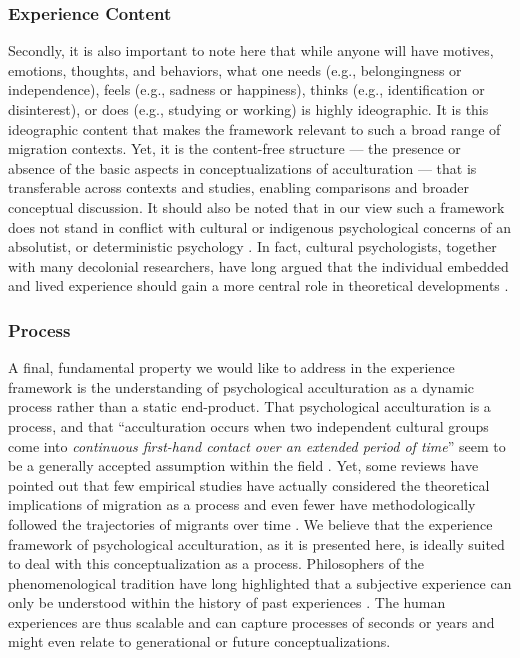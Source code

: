 \documentclass[man, 12pt, a4paper, mask]{apa7}
\begin{document}
\subsubsection{Experience Content}
Secondly, it is also important to note here that while anyone will have motives, emotions, thoughts, and behaviors, what one needs (e.g., belongingness or independence), feels (e.g., sadness or happiness), thinks (e.g., identification or disinterest), or does (e.g., studying or working) is highly ideographic. It is this ideographic content that makes the framework relevant to such a broad range of migration contexts. Yet, it is the content-free structure --- the presence or absence of the basic aspects in conceptualizations of acculturation --- that is transferable across contexts and studies, enabling comparisons and broader conceptual discussion. It should also be noted that in our view such a framework does not stand in conflict with cultural or indigenous psychological concerns of an absolutist, or deterministic psychology \citep[e.g.,][]{Kim2006a}. In fact, cultural psychologists, together with many decolonial researchers, have long argued that the individual embedded and lived experience should gain a more central role in theoretical developments \citep[e.g., ontological turn;][]{Pedersen2020}.

\subsubsection{Process}
A final, fundamental property we would like to address in the experience framework is the understanding of psychological acculturation as a dynamic process rather than a static end-product. That psychological acculturation is a process, and that ``acculturation occurs when two independent cultural groups come into \textit{continuous first-hand contact over an extended period of time}'' \citep[][186]{Berry1989} seem to be a generally accepted assumption within the field \citep[e.g.,][]{Ward2016}. Yet, some reviews have pointed out that few empirical studies have actually considered the theoretical implications of migration as a process and even fewer have methodologically followed the trajectories of migrants over time \citep[][]{Brown2011, Ward2019}. We believe that the experience framework of psychological acculturation, as it is presented here, is ideally suited to deal with this conceptualization as a process. Philosophers of the phenomenological tradition have long highlighted that a subjective experience can only be understood within the history of past experiences \citep[e.g.,][]{Heidegger1978}. The human experiences are thus scalable and can capture processes of seconds or years and might even relate to generational or future conceptualizations.
\end{document}
